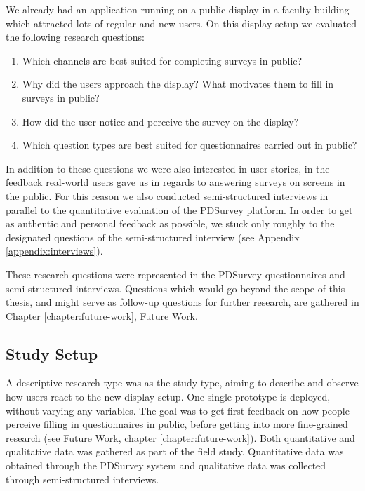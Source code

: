	We already had an application running on a public display in a faculty building which attracted lots of regular and new users. On this display setup we evaluated the following research questions:

	\begin{enumerate}
		\item Which channels are best suited for completing surveys in public?
		\item Why did the users approach the display? What motivates them to fill in surveys in public? 
		\item How did the user notice and perceive the survey on the display?
		\item Which question types are best suited for questionnaires carried out in public? 
	\end{enumerate}

	In addition to these questions we were also interested in user stories, in the feedback real-world users gave us in regards to answering surveys on screens in the public. For this reason we also conducted semi-structured interviews in parallel to the quantitative evaluation of the PDSurvey platform. In order to get as authentic and personal feedback as possible, we stuck only roughly to the designated questions of the semi-structured interview (see Appendix \ref{appendix:interviews}).

	These research questions were represented in the PDSurvey questionnaires and semi-structured interviews. Questions which would go beyond the scope of this thesis, and might serve as follow-up questions for further research, are gathered in Chapter \ref{chapter:future-work}, Future Work.



\subsection{Study Setup}

	A descriptive research type was as the study type, aiming to describe and observe how users react to the new display setup. One single prototype is deployed, without varying any variables. The goal was to get first feedback on how people perceive filling in questionnaires in public, before getting into more fine-grained research (see Future Work, chapter \ref{chapter:future-work}). 
	Both quantitative and qualitative data was gathered as part of the field study. Quantitative data was obtained through the PDSurvey system and qualitative data was collected through semi-structured interviews.



